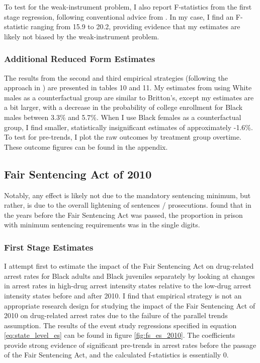 \documentclass{article}
\begin{document}
To test for the weak-instrument problem, I also report F-statistics from the first stage regression, following conventional advice from \cite{staiger1997precise}. In my case, I find an F-statistic ranging from 15.9 to 20.2, providing evidence that my estimates are likely not biased by the weak-instrument problem.

\subsubsection{Additional Reduced Form Estimates}

The results from the second and third empirical strategies (following the approach in \cite{britton2022}) are presented in tables 10 and 11. My estimates from using White males as a counterfactual group are similar to Britton's, except my estimates are a bit larger, with a decrease in the probability of college enrollment for Black males between 3.3\% and 5.7\%. When I use Black females as a counterfactual group, I find smaller, statistically insignificant estimates of approximately -1.6\%. To test for pre-trends, I plot the raw outcomes by treatment group overtime. These outcome figures can be found in the appendix.

\subsection{Fair Sentencing Act of 2010}

Notably, any effect is likely not due to the mandatory sentencing minimum, but rather, is due to the overall lightening of sentences / prosecutions. \cite{ussc} found that in the years before the Fair Sentencing Act was passed, the proportion in prison with minimum sentencing requirements was in the single digits.

\subsubsection{First Stage Estimates}

I attempt first to estimate the impact of the Fair Sentencing Act on drug-related arrest rates for Black adults and Black juveniles separately by looking at changes in arrest rates in high-drug arrest intensity states relative to the low-drug arrest intensity states before and after 2010.  I find that empirical strategy is not an appropriate research design for studying the impact of the Fair Sentencing Act of 2010 on drug-related arrest rates due to the failure of the parallel trends assumption. The results of the event study regressions specified in equation \ref{eq:state_level_es} can be found in figure \ref{fig:fs_es_2010}. The coefficients provide strong evidence of significant pre-trends in arrest rates before the passage of the Fair Sentencing Act, and the calculated f-statistics is essentially 0.
\end{document}
